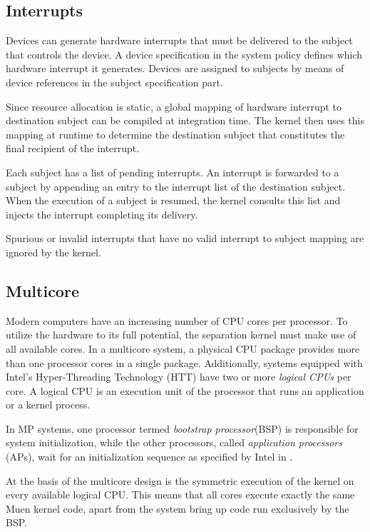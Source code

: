 \subsection{Interrupts}
Devices can generate hardware interrupts that must be delivered to the subject
that controls the device. A device specification in the system policy defines
which hardware interrupt it generates. Devices are assigned to subjects by means
of device references in the subject specification part.

Since resource allocation is static, a global mapping of hardware interrupt to
destination subject can be compiled at integration time. The kernel then uses
this mapping at runtime to determine the destination subject that constitutes
the final recipient of the interrupt.

Each subject has a list of pending interrupts. An interrupt is forwarded to a
subject by appending an entry to the interrupt list of the destination subject.
When the execution of a subject is resumed, the kernel consults this list and
injects the interrupt completing its delivery.

Spurious or invalid interrupts that have no valid interrupt to subject mapping
are ignored by the kernel.

\subsection{Multicore}\label{subsec:multicore}
Modern computers have an increasing number of CPU cores per processor. To
utilize the hardware to its full potential, the separation kernel must make use
of all available cores. In a multicore system, a physical CPU package provides
more than one processor cores in a single package. Additionally, systems
equipped with Intel's Hyper-Threading Technology (HTT) have two or more
\emph{logical CPUs} per core. A logical CPU is an execution unit of the
processor that runs an application or a kernel process.

In MP systems, one processor termed \emph{bootstrap processor}(BSP) is responsible for system initialization, while the other
processors, called \emph{application processors}
(APs), wait for an initialization sequence as specified by Intel in
\cite{intel:mp}.

At the basis of the multicore design is the symmetric execution of the kernel on
every available logical CPU. This means that all cores execute exactly the same
Muen kernel code, apart from the system bring up code run exclusively by the
BSP.

